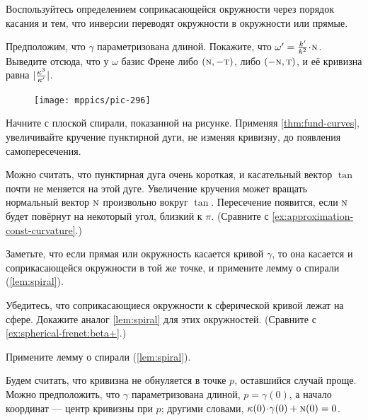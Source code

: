 \begin{multicols}{2}
Воспользуйтесь определением соприкасающейся окружности через порядок касания и тем, что инверсии переводят окружности в окружности или прямые.

Предположим, что $\gamma$ параметризована длиной.
Покажите, что $\omega'=\tfrac{\skur'}{\skur^2}\cdot \norm$. 
Выведите отсюда, что у $\omega$ базис Френе либо $(\text{\sc{n}},-\text{\sc{t}})$, либо $(-\text{\sc{n}},\text{\sc{t}})$, и её кривизна равна $|\tfrac{\kappa^3}{\kappa'}|$.

\begin{figure}
\vskip-4mm
\centering
\texttt{[image: mppics/pic-296]}
\vskip-0mm
\end{figure}

Начните с плоской спирали, показанной на рисунке.
Применяя \ref{thm:fund-curves}, увеличивайте кручение пунктирной дуги, не изменяя кривизну, до появления самопересечения.

Можно считать, что пунктирная дуга очень короткая, и касательный вектор $\tan$ почти не меняется на этой дуге. 
Увеличение кручения может вращать нормальный вектор $\text{\sc{n}}$ произвольно вокруг $\tan$.
Пересечение появится, если $\text{\sc{n}}$ будет повёрнут на некоторый угол, близкий к $\pi$.
(Сравните с \ref{ex:approximation-const-curvature}.)

Заметьте, что если прямая или окружность касается кривой $\gamma$, то она касается и соприкасающейся окружности в той же точке, и примените лемму о спирали (\ref{lem:spiral}).

Убедитесь, что соприкасающиеся окружности к сферической кривой лежат на сфере.
Докажите аналог \ref{lem:spiral} для этих окружностей.
(Сравните с \ref{ex:spherical-frenet:beta+}.)



\setcounter{eqtn}{0}

Примените лемму о спирали (\ref{lem:spiral}).

Будем считать, что кривизна не обнуляется в точке $p$, оставшийся случай проще.
Можно предположить, что $\gamma$ параметризована длиной, $p=\gamma(0)$, а начало координат --- центр кривизны при $p$;
другими словами, $\kur(0)\cdot\gamma(0)\z+ \norm(0)=0$.


\end{multicols}
